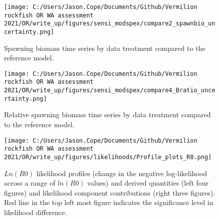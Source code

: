 \documentclass[11pt,
  english,
  a4paper,
]{article}
\begin{document}
\begin{figure}
\centering
\texttt{[image: C:/Users/Jason.Cope/Documents/Github/Vermilion rockfish OR WA assessment 2021/OR/write\_up/figures/sensi\_modspex/compare2\_spawnbio\_uncertainty.png]}
\caption{Spawning biomass time series by data treatment compared to the reference model.\label{fig:sensi-modspec-ssb}}
\end{figure}

\tagmcend\tagstructend


\begin{figure}
\centering
\texttt{[image: C:/Users/Jason.Cope/Documents/Github/Vermilion rockfish OR WA assessment 2021/OR/write\_up/figures/sensi\_modspex/compare4\_Bratio\_uncertainty.png]}
\caption{Relative spawning biomass time series by data treatment compared to the reference model.\label{fig:sensi-modspec-depl}}
\end{figure}

\tagmcend\tagstructend


\begin{figure}
\centering
\texttt{[image: C:/Users/Jason.Cope/Documents/Github/Vermilion rockfish OR WA assessment 2021/OR/write\_up/figures/likelihoods/Profile\_plots\_R0.png]}
\caption{{\(Ln(R0)\)\leavevmode\tagmcend\tagstructend} likelihood profiles (change in the negative log-likelihood across a range of {\(ln(R0)\)\leavevmode\tagmcend\tagstructend} values) and derived quantities (left four figures) and likelihood component contributions (right three figures). Red line in the top left most figure indicates the significance level in likelihood difference.\label{fig:r0-profile-combo}}
\end{figure}

\tagmcend\tagstructend
\end{document}
